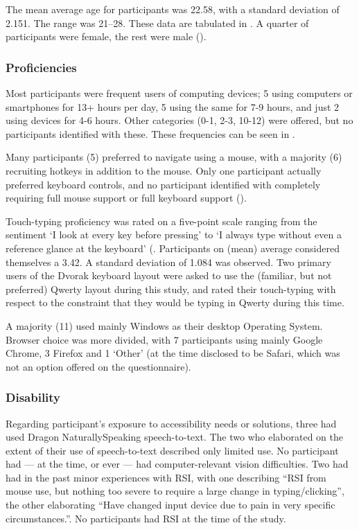 \documentclass[a4paper, 12pt]{report}
\begin{document}
The mean average age for participants was 22.58, with a standard deviation of 2.151. The range was 21--28. These data are tabulated in .
A quarter of participants were female, the rest were male ().

\subsubsection{Proficiencies}
Most participants were frequent users of computing devices; 5 using computers or smartphones for 13+ hours per day, 5 using the same for 7-9 hours, and just 2 using devices for 4-6 hours. Other categories (0-1, 2-3, 10-12) were offered, but no participants identified with these. These frequencies can be seen in .

Many participants (5) preferred to navigate using a mouse, with a majority (6) recruiting hotkeys in addition to the mouse. Only one participant actually preferred keyboard controls, and no participant identified with completely requiring full mouse support or full keyboard support ().

Touch-typing proficiency was rated on a five-point scale ranging from the sentiment `I look at every key before pressing' to `I always type without even a reference glance at the keyboard' (. Participants on (mean) average considered themselves a 3.42. A standard deviation of 1.084 was observed. Two primary users of the Dvorak keyboard layout were asked to use the (familiar, but not preferred) Qwerty layout during this study, and rated their touch-typing with respect to the constraint that they would be typing in Qwerty during this time.

A majority (11) used mainly Windows as their desktop Operating System. Browser choice was more divided, with 7 participants using mainly Google Chrome, 3 Firefox and 1 `Other' (at the time disclosed to be Safari, which was not an option offered on the questionnaire).

\subsubsection{Disability}
Regarding participant's exposure to accessibility needs or solutions, three had used Dragon NaturallySpeaking speech-to-text. The two who elaborated on the extent of their use of speech-to-text described only limited use. No participant had --- at the time, or ever --- had computer-relevant vision difficulties. Two had had in the past minor experiences with RSI, with one describing ``RSI from mouse use, but nothing too severe to require a large change in typing/clicking'', the other elaborating ``Have changed input device due to pain in very specific circumstances.''. No participants had RSI at the time of the study.
\end{document}
